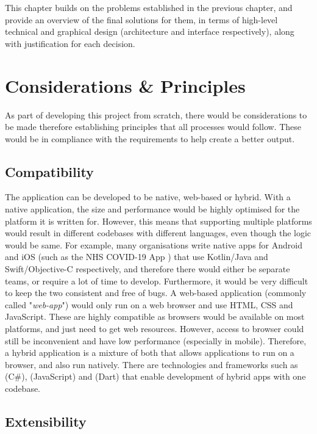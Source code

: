 \documentclass[../main.tex]{subfiles}
\begin{document}
This chapter builds on the problems established in the previous chapter, and provide an overview of the final solutions for them, in terms of high-level technical and graphical design (architecture and interface respectively), along with justification for each decision.

\section[Considerations]{Considerations \& Principles}

As part of developing this project from scratch, there would be considerations to be made therefore establishing principles that all processes would follow. These would be in compliance with the requirements to help create a better output.

\subsection{Compatibility}

The application can be developed to be native, web-based or hybrid. With a native application, the size and performance would be highly optimised for the platform it is written for. However, this means that supporting multiple platforms would result in different codebases with different languages, even though the logic would be same. For example, many organisations write native apps for Android and iOS (such as the NHS COVID-19 App \cite{Covid19ExposureApp2022,NHSCOVID19AG2022}) that use Kotlin/Java and Swift/Objective-C respectively, and therefore there would either be separate teams, or require a lot of time to develop. Furthermore, it would be very difficult to keep the two consistent and free of bugs. A web-based application (commonly called "\textit{web-app}") would only run on a web browser and use HTML, CSS and JavaScript. These are highly compatible as browsers would be available on most platforms, and just need to get web resources. However, access to browser could still be inconvenient and have low performance (especially in mobile). Therefore, a hybrid application is a mixture of both that allows applications to run on a browser, and also run natively. There are technologies and frameworks such as  (C\#),  (JavaScript) and  (Dart) that enable development of hybrid apps with one codebase.

\subsection{Extensibility}
\end{document}
